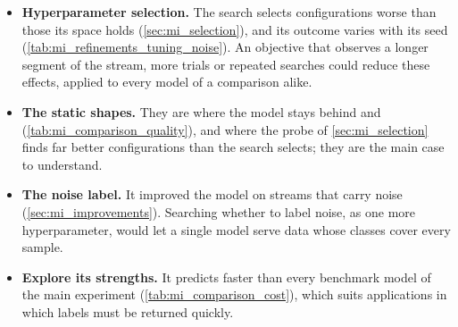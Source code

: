 \begin{itemize}
    \item \textbf{Hyperparameter selection.} The search selects configurations worse than those its space holds (\cref{sec:mi_selection}), and its outcome varies with its seed (\cref{tab:mi_refinements_tuning_noise}). An objective that observes a longer segment of the stream, more trials or repeated searches could reduce these effects, applied to every model of a comparison alike.
    \item \textbf{The static shapes.} They are where the model stays behind \CluStream and \StreamKM (\cref{tab:mi_comparison_quality}), and where the probe of \cref{sec:mi_selection} finds far better configurations than the search selects; they are the main case to understand.
    \item \textbf{The noise label.} It improved the model on streams that carry noise (\cref{sec:mi_improvements}). Searching whether to label noise, as one more hyperparameter, would let a single model serve data whose classes cover every sample.
    \item \textbf{Explore its strengths.} It predicts faster than every benchmark model of the main experiment (\cref{tab:mi_comparison_cost}), which suits applications in which labels must be returned quickly.
\end{itemize}

\clearpage
